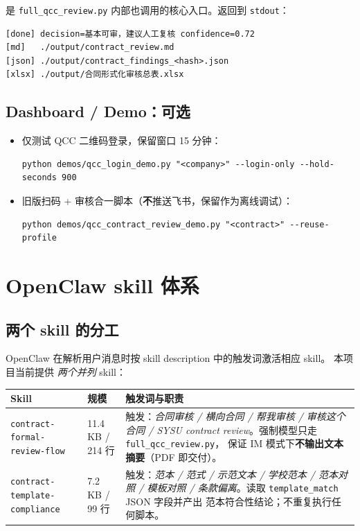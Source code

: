 \documentclass[11pt,a4paper]{article}
\newcommand{\bt}[1]{\nolinkurl{#1}}
\begin{document}
是 \texttt{full\_qcc\_review.py} 内部也调用的核心入口。返回到 \texttt{stdout}：

\begin{lstlisting}[style=shell]
[done] decision=基本可审，建议人工复核 confidence=0.72
[md]   ./output/contract_review.md
[json] ./output/contract_findings_<hash>.json
[xlsx] ./output/合同形式化审核总表.xlsx
\end{lstlisting}

\subsection{Dashboard / Demo：可选}

\begin{itemize}[leftmargin=1.4em,itemsep=2pt]
  \item 仅测试 QCC 二维码登录，保留窗口 15 分钟：
\begin{lstlisting}[style=shell]
python demos/qcc_login_demo.py "<company>" --login-only --hold-seconds 900
\end{lstlisting}
  \item 旧版扫码 + 审核合一脚本（\textbf{不}推送飞书，保留作为离线调试）：
\begin{lstlisting}[style=shell]
python demos/qcc_contract_review_demo.py "<contract>" --reuse-profile
\end{lstlisting}
\end{itemize}

\section{OpenClaw skill 体系}

\subsection{两个 skill 的分工}

OpenClaw 在解析用户消息时按 skill description 中的触发词激活相应 skill。
本项目当前提供 \emph{两个并列} skill：

\begin{longtable}{>{\raggedright\arraybackslash}p{4.8cm}
                  p{2.6cm}
                  >{\raggedright\arraybackslash}p{7.6cm}}
\toprule
\textbf{Skill} & \textbf{规模} & \textbf{触发词与职责} \\ \midrule
\endhead
\bt{contract-formal-review-flow} & 11.4 KB / 214 行
& 触发：\emph{合同审核 / 横向合同 / 帮我审核 / 审核这个合同 /
SYSU contract review}。强制模型只走 \bt{full_qcc_review.py}，
保证 IM 模式下\textbf{不输出文本摘要}（PDF 即交付）。 \\
\bt{contract-template-compliance} & 7.2 KB / 99 行
& 触发：\emph{范本 / 范式 / 示范文本 / 学校范本 / 范本对照 /
模板对照 / 条款偏离}。读取 \bt{template_match} JSON 字段并产出
范本符合性结论；不重复执行任何脚本。 \\
\bottomrule
\end{longtable}
\end{document}
